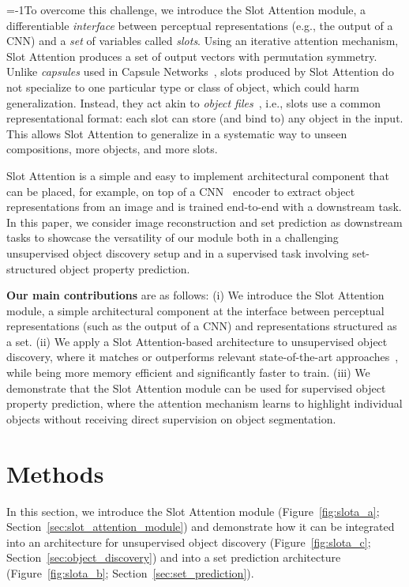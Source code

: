 \documentclass{article}
\newcommand{\sam}[0]{Slot Attention\xspace}
\begin{document}
\looseness=-1To overcome this challenge, we introduce the Slot Attention module, a differentiable \textit{interface} between perceptual representations (e.g., the output of a CNN) and a \textit{set} of variables called \textit{slots}. Using an iterative attention mechanism, \sam produces a set of output vectors with permutation symmetry. Unlike \textit{capsules} used in Capsule Networks~\citep{sabour2017dynamic,hinton2018matrix}, slots produced by \sam do not specialize to one particular type or class of object, which could harm generalization. Instead, they act akin to \textit{object files}~\citep{kahneman1992reviewing}, i.e., slots use a common representational format: each slot can store (and bind to) any object in the input. This allows \sam to generalize in a systematic way to unseen compositions, more objects, and more slots.

\sam is a simple and easy to implement architectural component that can be placed, for example, on top of a CNN~\citep{lecun1995convolutional} encoder to extract object representations from an image and is trained end-to-end with a downstream task. In this paper, we consider image reconstruction and set prediction as downstream tasks to showcase the versatility of our module both in a challenging unsupervised object discovery setup and in a supervised task involving set-structured object property prediction.

\textbf{Our main contributions} are as follows:
(i) We introduce the Slot Attention module, a simple architectural component at the interface between perceptual representations (such as the output of a CNN) and representations structured as a set.
(ii) We apply a \sam-based architecture to unsupervised object discovery, where it matches or outperforms relevant state-of-the-art approaches~\citep{greff2019multi,burgess2019monet}, while being more memory efficient and significantly faster to train.
(iii) We demonstrate that the Slot Attention module can be used for supervised object property prediction, where the attention mechanism learns to highlight individual objects without receiving direct supervision on object segmentation.

\section{Methods}
In this section, we introduce the Slot Attention module (Figure~\ref{fig:slota_a}; Section~\ref{sec:slot_attention_module}) and demonstrate how it can be integrated into an architecture for unsupervised object discovery (Figure~\ref{fig:slota_c}; Section~\ref{sec:object_discovery}) and into a set prediction architecture (Figure~\ref{fig:slota_b}; Section~\ref{sec:set_prediction}).
\end{document}
